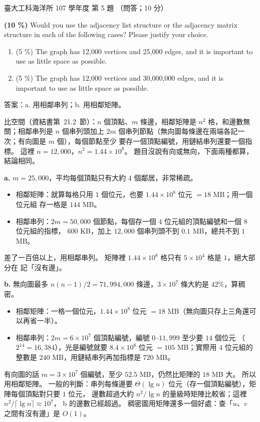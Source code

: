 \begin{pastexam}[label={px:ntu-107-esoe-ds-05}]{臺大工科海洋所 107 學年度 第 5 題}
（問答；10 分）

\textbf{(10 \%)} Would you use the adjacency list structure or the adjacency matrix structure in each
of the following cases? Please justify your choice.
\begin{enumerate}[label=\alph*.]
\item (5 \%) The graph has 12,000 vertices and 25,000 edges, and it is important to use as little
space as possible.
\item (5 \%) The graph has 12,000 vertices and 30,000,000 edges, and it is important to use as little
space as possible.
\end{enumerate}
\end{pastexam}

\begin{pastsoln}
答案：a. 用相鄰串列；b. 用相鄰矩陣。

比空間（資結書第~21.2~節）：$n$ 個頂點、$m$ 條邊，相鄰矩陣是 $n^2$ 格，和邊數無關；相鄰串列是
$n$ 個串列頭加上 $2m$ 個串列節點（無向圖每條邊在兩端各記一次；有向圖是 $m$ 個），每個節點至少
要存一個頂點編號，用鏈結串列還要一個指標。 這裡 $n = 12{,}000$，$n^2 = 1.44 \times 10^8$。
題目沒說有向或無向，下面兩種都算，結論相同。

\textbf{a.} $m = 25{,}000$，平均每個頂點只有大約 $4$ 個鄰居，非常稀疏。
\begin{itemize}
\item 相鄰矩陣：就算每格只用 $1$ 個位元，也要 $1.44 \times 10^8$ 位元 $= 18$ MB；用一個位元組
存一格是 $144$ MB。
\item 相鄰串列：$2m = 50{,}000$ 個節點，每個存一個 $4$ 位元組的頂點編號和一個 $8$ 位元組的指標，
$600$ KB，加上 $12{,}000$ 個串列頭不到 $0.1$ MB，總共不到 $1$ MB。
\end{itemize}
差了一百倍以上，用相鄰串列。 矩陣裡 $1.44 \times 10^8$ 格只有 $5 \times 10^4$ 格是 $1$，絕大部分在
記「沒有邊」。

\textbf{b.} 無向圖最多 $n(n-1)/2 = 71{,}994{,}000$ 條邊，$3 \times 10^7$ 條大約是 $42\%$，算稠密。
\begin{itemize}
\item 相鄰矩陣：一格一個位元，$1.44 \times 10^8$ 位元 $= 18$ MB（無向圖只存上三角還可以再省一半）。
\item 相鄰串列：$2m = 6 \times 10^7$ 個頂點編號，編號 $0$--$11{,}999$ 至少要 $14$ 個位元
（$2^{14} = 16{,}384$），光是編號就要 $8.4 \times 10^8$ 位元 $= 105$ MB；實際用 $4$ 位元組的整數是
$240$ MB，用鏈結串列再加指標是 $720$ MB。
\end{itemize}
有向圖的話 $m = 3 \times 10^7$ 個編號，至少 $52.5$ MB，仍然比矩陣的 $18$ MB 大。 所以用相鄰矩陣。
一般的判斷：串列每條邊要 $\Theta(\lg n)$ 位元（存一個頂點編號），矩陣每個頂點對只要 $1$ 位元，
邊數超過大約 $n^2 / \lg n$ 的量級時矩陣比較省；這裡 $n^2 / \lceil \lg n \rceil \approx 10^7$，
b 的邊數已經超過。 稠密圖用矩陣還多一個好處：查「$u$、$v$ 之間有沒有邊」是 $O(1)$。
\end{pastsoln}
